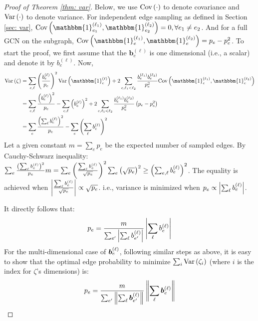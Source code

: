 \begin{proof}[Proof of Theorem \ref{thm: var}]
Below, we use $\text{Cov}\left( \cdot \right)$ to denote covariance and $\text{Var}\left( \cdot \right)$ to denote variance. 
For independent edge sampling as defined in Section \ref{sec: var}, $\text{Cov}\paren{\mathbbm{1}_{e_1}^{\paren{\ell_1}}, \mathbbm{1}_{e_2}^{\paren{\ell_2}}} = 0, \forall e_1 \neq e_2$. And for a full GCN on the subgraph, $\text{Cov}\paren{\mathbbm{1}_{e}^{\paren{\ell_1}}, \mathbbm{1}_{e}^{\paren{\ell_2}}} = p_e - p_e^2$. To start the proof, we first assume that the $\bm{b}_e^{(\ell)}$ is one dimensional (i.e., a scalar) and denote it by $b_e^{(\ell)}$.
Now,
\begin{align}
    \mbox{Var}\paren{\zeta} &= \sum_{e, \ell} \left(\frac{b_e^{(\ell)}}{p_e}\right)^2 \text{Var}\paren{\mathbbm{1}_{e}^{\paren{\ell}}} + 2\sum_{e, \ell_1 < \ell_2} \frac{b_{e}^{\paren{\ell_1}}b_{e}^{\paren{\ell_2}}}{p_e^2}\text{Cov}\paren{\mathbbm{1}_{e}^{\paren{\ell_1}}, \mathbbm{1}_{e}^{\paren{\ell_2}}} \nonumber \\
    &= \sum_{e, \ell} \frac{\paren{b_{e}^{\paren{\ell}}}^2}{p_e} - \sum_{e,\ell} \paren{b_{e}^{\paren{\ell}}}^2 + 2 \sum_{e, \ell_1 < \ell_2} \frac{b_{e}^{\paren{\ell_1}}b_{e}^{\paren{\ell_2}}}{p_e^2}\left(p_e - p_e^2\right) \nonumber \\
    &= \sum_e\frac{\paren{\sum_\ell b_e^{(\ell)}}^2}{p_e} - \sum_e \left(\sum_\ell b_e^{(\ell)}\right)^2
\end{align}
Let a given constant $m = \sum_e p_e$ be the expected number of sampled edges.
By Cauchy-Schwarz inequality: $\sum_e\frac{\left( \sum_\ell b_e^{\left( \ell \right)} \right)^2}{p_e}m=\sum_e \left(\frac{\sum_\ell b_e^{(\ell)}}{\sqrt{p_e}}\right)^2 \sum_e \left( \sqrt{p_e} \right)^2\geq \left(\sum_{e, \ell} b_e^{(\ell)}\right)^2$. 
The equality is achieved when $\left\lvert \frac{\sum_\ell b_e^{(\ell)}}{\sqrt{p_e}} \right\rvert \propto \sqrt{p_e}$. i.e., variance is minimized when
$p_e \propto \left\lvert \sum_\ell b_e^{(\ell)} \right\rvert$.

It directly follows that:
\begin{align}
    p_e = \frac{m}{\sum_{e'}\left\lvert \sum_{\ell}b_{e'}^{\left( \ell \right)} \right\rvert}\left\lvert \sum_{\ell}b_e^{\left( \ell \right)} \right\rvert \nonumber
\end{align}
For the multi-dimensional case of $\bm{b}_e^{\left( \ell \right)}$, following similar steps as above, it is easy to show that the optimal edge probability to minimize $\sum_i \text{Var}\left( \zeta_i \right)$ (where $i$ is the index for $\zeta$'s dimensions) is:
\begin{align}
    p_e = \frac{m}{\sum_{e'}\left\|\sum_{\ell}\bm{b}_{e'}^{\left( \ell \right)}\right\|}\left\|\sum_{\ell}\bm{b}_e^{\left( \ell \right)}\right\| \nonumber
\end{align}
\end{proof}


